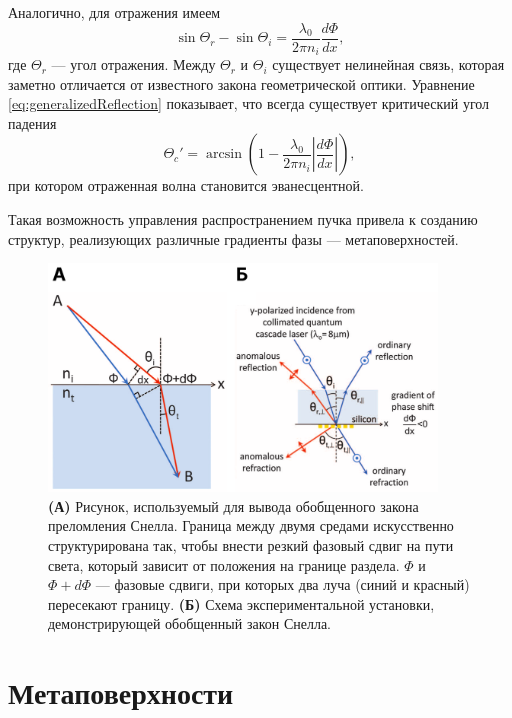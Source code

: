 Аналогично, для отражения имеем
\begin{equation}
    \label{eq:generalizedReflection}
    \sin\Theta_r - \sin\Theta_i = \frac{\lambda_0}{2\pi n_i}\frac{d\Phi}{dx},
\end{equation}
где $\Theta_r$ --- угол отражения. Между $\Theta_r$ и $\Theta_i$ существует нелинейная связь, которая заметно отличается от известного закона геометрической оптики. Уравнение \eqref{eq:generalizedReflection} показывает, что всегда существует критический угол падения
\begin{equation}
    \Theta_c' = \arcsin\left(1 - \frac{\lambda_0}{2\pi n_i}\left|\frac{d\Phi}{dx}\right|\right),
\end{equation}
при котором отраженная волна становится эванесцентной.

Такая возможность управления распространением пучка привела к созданию структур, реализующих различные градиенты фазы --- метаповерхностей.

\begin{figure}
    \begin{center}
        \includegraphics[width=0.92\textwidth]{pictures/Generalized_Snell's_law.png}
        \caption{\textbf{(А)} Рисунок, используемый для вывода обобщенного закона преломления Снелла. Граница между двумя средами искусственно структурирована так, чтобы внести резкий фазовый сдвиг на пути света, который зависит от положения на границе раздела. $\Phi$ и $\Phi + d\Phi$ — фазовые сдвиги, при которых два луча (синий и красный) пересекают границу.\cite[Fig. 1]{generalized2011} \textbf{(Б)} Схема экспериментальной установки, демонстрирующей обобщенный закон Снелла.\cite[Fig. 3B]{generalized2011}}
    \end{center}
    \label{fig:generalized}
\end{figure}

\section{Метаповерхности}

